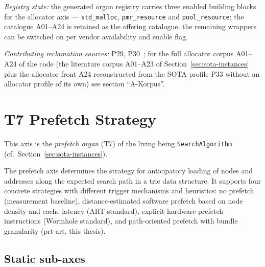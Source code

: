 \begin{scriptsize}
\begin{longtable}{@{}>{\raggedright\arraybackslash}p{4.0cm} >{\raggedright\arraybackslash}p{6.5cm} >{\raggedright\arraybackslash}p{3.0cm}@{}}
\bottomrule
\end{longtable}
\end{scriptsize}

\emph{Registry state:} the generated organ registry carries three enabled building blocks for the allocator axis --- \texttt{std\_\allowbreak{}malloc}, \texttt{pmr\_\allowbreak{}resource} and \texttt{pool\_\allowbreak{}resource}; the catalogue A01--A24 is retained as the offering catalogue, the remaining wrappers can be switched on per vendor availability and enable flag.

\emph{Contributing reclamation sources:} P29, P30~\cite{mckenney2001rcu,michael2004hazard}; for the full allocator corpus A01--A24 of the code (the literature corpus A01--A23 of Section~\ref{sec:sota-instances} plus the allocator front A24 reconstructed from the SOTA profile P33 without an allocator profile of its own) see section \enquote{A-Korpus}.

\section{T7 Prefetch Strategy}

This axis is the \emph{prefetch organ} (T7) of the living being \texttt{SearchAlgorithm} (cf.\ Section~\ref{sec:sota-instances}).

The prefetch axis determines the strategy for anticipatory loading of nodes and addresses along the expected search path in a trie data structure. It supports four concrete strategies with different trigger mechanisms and heuristics: no prefetch (measurement baseline), distance-estimated software prefetch based on node density and cache latency (ART standard), explicit hardware prefetch instructions (Wormhole standard), and path-oriented prefetch with bundle granularity (prt-art, this thesis).

\subsection*{Static sub-axes}

